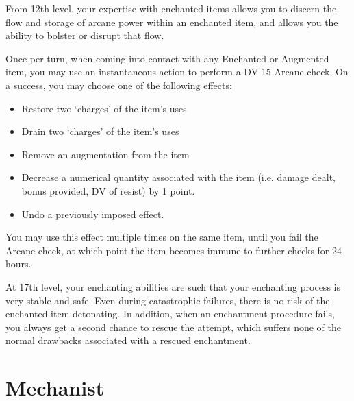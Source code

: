 {
	From 12th level, your expertise with enchanted items allows you to discern the flow and storage of arcane power within an enchanted item, and allows you the ability to bolster or disrupt that flow. 
	
	Once per turn, when coming into contact with any Enchanted or Augmented item, you may use an instantaneous action to perform a DV 15 Arcane check. On a success, you may choose one of the following effects:
	\begin{itemize}
		\item Restore two `charges' of the item's uses
		\item Drain two `charges' of the item's uses
		\item Remove an augmentation from the item 
		\item Decrease a numerical quantity associated with the item (i.e. damage dealt, bonus provided, DV of resist) by 1 point. 
		\item Undo a previously imposed effect. 
	\end{itemize}  
	
	You may use this effect multiple times on the same item, until you fail the Arcane check, at which point the item becomes immune to further checks for 24 hours. 
}

{
	At 17th level, your enchanting abilities are such that your enchanting process is very stable and safe. Even during catastrophic failures, there is no risk of the enchanted item detonating. In addition, when an enchantment procedure fails, you always get a second chance to rescue the attempt,  which suffers none of the normal drawbacks associated with a rescued enchantment.  
}


\section*{Mechanist}


